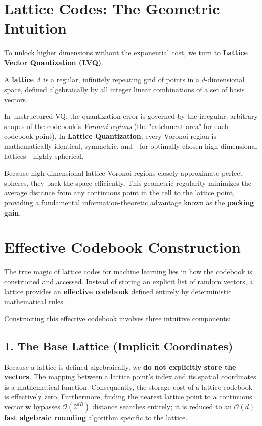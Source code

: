 \documentclass[11pt]{article}
\begin{document}
\section{Lattice Codes: The Geometric Intuition}

To unlock higher dimensions without the exponential cost, we turn to \textbf{Lattice Vector Quantization (LVQ)}. 

A \textbf{lattice} $\Lambda$ is a regular, infinitely repeating grid of points in a $d$-dimensional space, defined algebraically by all integer linear combinations of a set of basis vectors. 

In unstructured VQ, the quantization error is governed by the irregular, arbitrary shapes of the codebook's \textit{Voronoi regions} (the "catchment area" for each codebook point). In \textbf{Lattice Quantization}, every Voronoi region is mathematically identical, symmetric, and---for optimally chosen high-dimensional lattices---highly spherical. 

Because high-dimensional lattice Voronoi regions closely approximate perfect spheres, they pack the space efficiently. This geometric regularity minimizes the average distance from any continuous point in the cell to the lattice point, providing a fundamental information-theoretic advantage known as the \textbf{packing gain}.

\section{Effective Codebook Construction}

The true magic of lattice codes for machine learning lies in how the codebook is constructed and accessed. Instead of storing an explicit list of random vectors, a lattice provides an \textbf{effective codebook} defined entirely by deterministic mathematical rules.

Constructing this effective codebook involves three intuitive components:

\subsection{1. The Base Lattice (Implicit Coordinates)}
Because a lattice is defined algebraically, we \textbf{do not explicitly store the vectors}. The mapping between a lattice point's index and its spatial coordinates is a mathematical function. Consequently, the storage cost of a lattice codebook is effectively zero. Furthermore, finding the nearest lattice point to a continuous vector $\mathbf{w}$ bypasses $\mathcal{O}(2^{dR})$ distance searches entirely; it is reduced to an $\mathcal{O}(d)$ \textbf{fast algebraic rounding} algorithm specific to the lattice.
\end{document}
